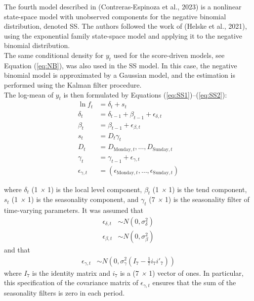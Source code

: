 The fourth model described in (Contreras-Espinoza et al., 2023) is a nonlinear state-space model with unobserved components for the negative binomial distribution, denoted SS. The authors followed the work of (Helske et al., 2021), using the exponential family state-space model and applying it to the
negative binomial distribution. \\

The same conditional density for $y_t$ used for the score-driven models, see Equation (\ref{eq:NB}), was also used in the SS model. In this case, the negative binomial model is approximated by a Gaussian model, and the estimation is performed using the Kalman filter procedure. \\

The log-mean of $y_t$ is then formulated by Equations (\ref{eq:SS1})--(\ref{eq:SS2}):
\allowdisplaybreaks
\begin{align}
    \ln f_t &= \delta_t + s_t \label{eq:SS1}\\
    \delta_t & = \delta_{t-1} + \beta_{t-1} + \epsilon_{\delta, t} \\
    \beta_t & = \beta_{t-1} + \epsilon_{\beta, t} \\
    s_t &= D_t \gamma_t \\
    D_t & = D_{\text{Monday}, t}, \dots, D_{\text{Sunday}, t} \\
    \gamma_t &= \gamma_{t-1} + \epsilon_{\gamma, t} \\
    \epsilon_{\gamma, t} &=(\epsilon_{\text{Monday}, t}, \dots, \epsilon_{\text{Sunday}, t}) \label{eq:SS2}
\end{align}

where $\delta_t$ (1 \emph{×} 1) is the local level component, $\beta_t$
(1 \emph{×} 1) is the tend component, $s_t$ (1 \emph{×} 1) is the
seasonality component, and $\gamma_t$ (7 \emph{×} 1) is the seasonality
filter of time-varying parameters. It was assumed that
\begin{align*}
    \epsilon_{\delta, t} &\sim N(0,\sigma^2_{\delta}) \\
    \epsilon_{\beta, t} &\sim N(0,\sigma^2_{\beta}) 
\end{align*}
and that
\begin{align*}
    \epsilon_{\gamma, t} & \sim N(0, \sigma^2_{\gamma}(I_7 - \frac{1}{7} i_7 i'_7))
\end{align*}
where $I_7$ is the identity matrix and $i_7$ is a (7 \emph{×} 1)
vector of ones. In particular, this specification of the covariance matrix of $\epsilon_{\gamma, t}$ ensures that the sum of the seasonality filters is zero in each period. \\

